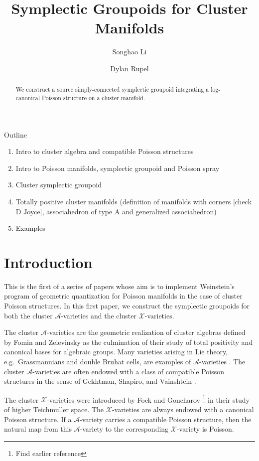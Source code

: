 \documentclass{amsart}
\title{Symplectic Groupoids for Cluster Manifolds}
\author{Songhao Li}
\author{Dylan Rupel}
\numberwithin{equation}{section}
\newcommand{\cA}{\mathcal{A}}
\newcommand{\cX}{\mathcal{X}}
\begin{document}
\begin{abstract}
  We construct a source simply-connected symplectic groupoid integrating a log-canonical Poisson structure on a cluster manifold.
\end{abstract}
\maketitle
Outline
\begin{enumerate}
	\item Intro to cluster algebra and compatible Poisson structures 
	\item Intro to Poisson manifolds, symplectic groupoid and Poisson spray
	\item Cluster symplectic groupoid
	\item Totally positive cluster manifolds (definition of manifolds with corners [check D Joyce], associahedron of type A and generalized associahedron)
	\item Examples
\end{enumerate}

\section{Introduction}
This is the first of a series of papers whose aim is to implement Weinstein's program of geometric quantization for Poisson manifolds \cite{MR1104934} in the case of cluster Poisson structures. In this first paper, we construct the symplectic groupoids for both the cluster $\cA$-varieties and the cluster $\cX$-varieties. 

The cluster $\cA$-varieties are the geometric realization of cluster algebras defined by Fomin and Zelevinsky \cite{MR1887642} as the culmination of their study of total positivity and canonical bases for algebraic groups. Many varieties arising in Lie theory, e.g.\ Grassmannians and double Bruhat cells, are examples of $\cA$-varieties \cite{berenstein-fomin-zelevinsky,scott,gekhtman-shapiro-vainshtein,williams}. The cluster $\cA$-varieties are often endowed with a class of compatible Poisson structures in the sense of Gekhtman, Shapiro, and Vainshtein \cite{MR2683456}.

The cluster $\cX$-varieties were introduced by Fock and Goncharov \cite{MR2470108}\footnote{Find earlier reference} in their study of higher Teichmuller space. The $\cX$-varieties are always endowed with a canonical Poisson structure. If a $\cA$-variety carries a compatible Poisson structure, then the natural map from this $\cA$-variety to the corresponding $\cX$-variety is Poisson.
\end{document}
